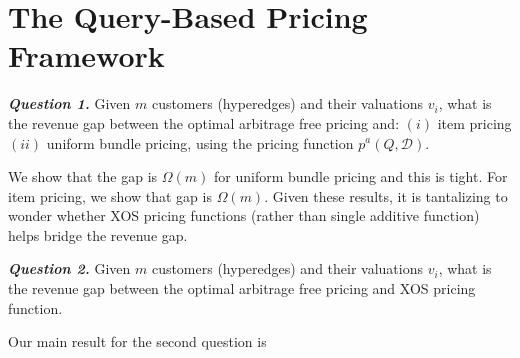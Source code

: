 \section{The Query-Based Pricing Framework}
\label{sec:framework}


\textbf{\textit{Question 1.}} Given $m$ customers (hyperedges) and their valuations $v_i$, what is the revenue gap between the optimal arbitrage free pricing and: $(i)$ item pricing $(ii)$ uniform bundle pricing, using the pricing function $p^{a}(Q,\mathcal{D})$.

\vspace{1em}
We show that the gap is $\Omega(m)$ for uniform bundle pricing and this is tight. For item pricing, we show that gap is $\Omega(m)$. Given these results, it is tantalizing to wonder whether XOS pricing functions (rather than single additive function) helps bridge the revenue gap. 

\vspace{1em}
\textbf{\textit{Question 2.}} Given $m$ customers (hyperedges) and their valuations $v_i$, what is the revenue gap between the optimal arbitrage free pricing and XOS pricing function.

\vspace{1em}
Our main result for the second question is 